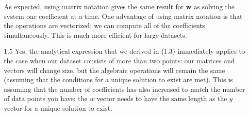 \documentclass{harvardml}
\theoremstyle{definition}
\theoremstyle{plain}
\begin{document}
As expected, using matrix notation gives the same result for $\mathbf{w}$ as solving the system one coefficient at a time. One advantage of using matrix notation is that the operations are vectorized: we can compute all of the coefficients simultaneously. This is much more efficient for large datasets.

\medskip

1.5 Yes, the analytical expression that we derived in (1.3) immediately applies to the case when our dataset consists of more than two points: our matrices and vectors will change size, but the algebraic operations will remain the same (assuming that the conditions for a unique solution to exist are met). This is assuming that the number of coefficients has also increased to match the number of data points you have: the $w$ vector needs to have the same length as the $y$ vector for a unique solution to exist.

\newpage
\end{document}
